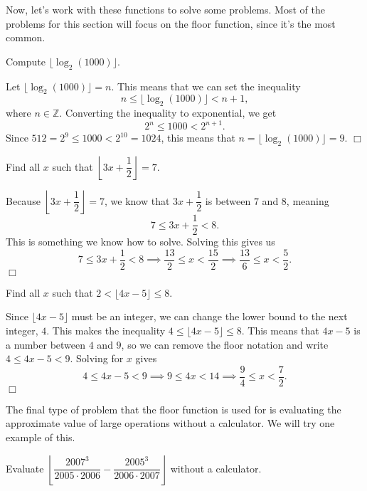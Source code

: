\documentclass[lang=en,11pt]{elegantbook}
\begin{document}
Now, let's work with these functions to solve some problems.  Most of the problems for this section will focus on the floor function, since it's the most common.
\begin{example}
Compute $\lfloor{\log_2(1000)\rfloor}$.
\end{example}
\begin{solution}
Let $\lfloor{\log_2(1000)\rfloor}=n$.  This means that we can set the inequality $$n\leq\lfloor{\log_2(1000)\rfloor}<n+1,$$ where $n\in\mathbb{Z}$.  Converting the inequality to exponential, we get $$2^n\leq 1000<2^{n+1}.$$  Since $512=2^9\leq 1000<2^{10}=1024$, this means that $n=\lfloor{\log_2(1000)\rfloor}=9$. $\Box$
\end{solution}
\begin{example}
Find all $x$ such that $\left\lfloor{3x+\dfrac{1}{2}}\right\rfloor=7$.
\end{example}
\begin{solution}
Because $\left\lfloor{3x+\dfrac{1}{2}}\right\rfloor=7$, we know that $3x+\dfrac{1}{2}$ is between $7$ and $8$, meaning $$7\leq 3x+\dfrac{1}{2}<8.$$  This is something we know how to solve.  Solving this gives us $$7\leq 3x+\dfrac{1}{2}<8 \implies \dfrac{13}{2}\leq x<\dfrac{15}{2} \implies \dfrac{13}{6}\leq x<\dfrac{5}{2}.$$ $\Box$
\end{solution}
\begin{example}
Find all $x$ such that $2<\lfloor{4x-5}\rfloor\leq 8$.
\end{example}
\begin{solution}
Since $\lfloor{4x-5}\rfloor$ must be an integer, we can change the lower bound to the next integer, $4$.  This makes the inequality $4\leq \lfloor{4x-5}\rfloor\leq 8$.  This means that $4x-5$ is a number between $4$ and $9$, so we can remove the floor notation and write $4\leq 4x-5<9$.  Solving for $x$ gives $$4\leq 4x-5<9 \implies 9\leq 4x<14 \implies \dfrac{9}{4}\leq x<\dfrac{7}{2}.$$ $\Box$
\end{solution}
The final type of problem that the floor function is used for is evaluating the approximate value of large operations without a calculator.  We will try one example of this.
\begin{example}
Evaluate $\left\lfloor{\dfrac{2007^3}{2005 \cdot 2006}-\dfrac{2005^3}{2006\cdot 2007}}\right\rfloor$ without a calculator.
\end{example}
\end{document}
